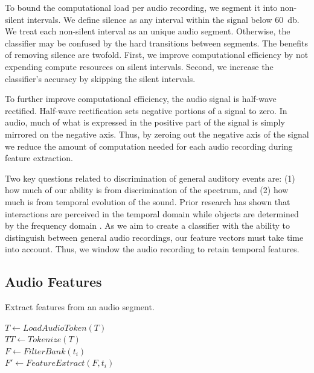 %
To bound the computational load per audio recording, we segment it into
non-silent intervals.
%
We define silence as any interval within the signal below 60~db. 
%
We treat each non-silent interval as an unique audio segment.
%
Otherwise, the classifier may be confused by the hard transitions between
segments.
%
The benefits of removing silence are twofold.
%
First, we improve computational efficiency by not expending compute resources 
on silent intervals.
%
Second, we increase the classifier's accuracy by skipping the silent intervals.

%
To further improve computational efficiency, the audio signal is half-wave
rectified.
%
Half-wave rectification sets negative portions of a signal to zero. 
%
In audio, much of what is expressed in the positive part of the signal is 
simply mirrored on the negative axis.
%
Thus, by zeroing out the negative axis of the signal we reduce the amount of
computation needed for each audio recording during feature extraction.

%
Two key questions related to discrimination of general auditory events are: 
(1) how much of our ability is from discrimination of the spectrum, and 
(2) how much is from temporal evolution of the sound.
%
Prior research has shown that interactions are perceived in the temporal domain
while objects are determined by the frequency domain \cite{Vanderveer1980}. 
%
As we aim to create a classifier with the ability to distinguish between 
general audio recordings, our feature vectors must take time into account. 
%
Thus, we window the audio recording to retain temporal features.

\subsection{Audio Features}

\begin{algorithm}[t]
    \caption{Extract features from an audio segment.}
    \label{alg:encoder}
    \SetAlgoLined
        
     {
        $T \gets LoadAudioToken(T)$\\
        $TT \gets Tokenize(T)$\\
         {
            $F \gets FilterBank(t_i)$ \\
            $F' \gets FeatureExtract(F, t_i)$
        }
    }
\end{algorithm}


